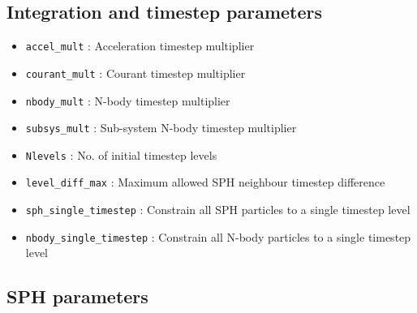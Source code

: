 \documentclass[a4paper]{article}
\newcommand{\var}[1]{\texttt{#1}}
\begin{document}
\subsection{Integration and timestep parameters}

\begin{itemize}

\item \var{accel\_mult} : Acceleration timestep multiplier

\item \var{courant\_mult} : Courant timestep multiplier

\item \var{nbody\_mult} : N-body timestep multiplier

\item \var{subsys\_mult} : Sub-system N-body timestep multiplier

\item \var{Nlevels} : No. of initial timestep levels

\item \var{level\_diff\_max} : Maximum allowed SPH neighbour timestep difference

\item \var{sph\_single\_timestep} : Constrain all SPH particles to a single timestep level 

\item \var{nbody\_single\_timestep} : Constrain all N-body particles to a single timestep level 


\end{itemize}




\subsection{SPH parameters}
\end{document}
